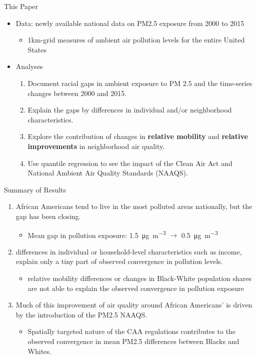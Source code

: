 \documentclass[dvipdfmx,12pt]{beamer}
\begin{document}
\begin{frame}{This Paper}
  \begin{itemize}
    \item Data: newly available national data on PM2.5 exposure from 2000 to 2015
    \begin{itemize}
      \item 1km-grid measures of ambient air pollution levels for the entire United States
    \end{itemize}
    \item Analyses
    \begin{enumerate}
      \item Document racial gaps in ambient exposure to PM 2.5 and the time-series changes between 2000 and 2015.
      \item Explain the gaps by differences in individual and/or neighborhood characteristics.
      \item Explore the contribution of changes in \textbf{relative mobility} and \textbf{relative improvements} in neighborhood air quality.
      \item Use quantile regression to see the impact of the Clean Air Act and National Ambient Air Quality Standards (NAAQS).
    \end{enumerate}
  \end{itemize}
\end{frame}

\begin{frame}{Summary of Results}
  \begin{enumerate}
    \item African Americans tend to live in the most polluted areas nationally, but the gap has been closing.
    \begin{itemize}
      \item Mean gap in pollution exposure: \SI[per-mode=symbol]{1.5}{\micro \gram \per \cubic \meter} $\rightarrow$ \SI[per-mode=symbol]{0.5}{\micro \gram \per \cubic \meter}
    \end{itemize}
    \item differences in individual or household-level characteristics such as income, explain only a tiny part of observed convergence in pollution levels.
    \begin{itemize}
      \item relative mobility differences or changes in Black-White population shares are not able to explain the observed convergence in pollution exposure
    \end{itemize}
    \item Much of this improvement of air quality around African Americans' is driven by the introduction of the PM2.5 NAAQS.
    \begin{itemize}
      \item Spatially targeted nature of the CAA regulations contributes to the observed convergence in
      mean PM2.5 differences between Blacks and Whites.
    \end{itemize}
  \end{enumerate}
\end{frame}
\end{document}
